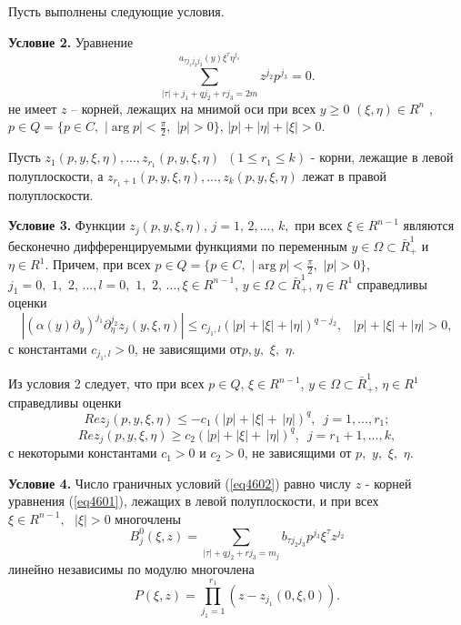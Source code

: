 Пусть выполнены следующие условия.

\textbf{Условие 2.} Уравнение
\[
\sum\limits_{\left| \tau \right| + j_1 + qj_2 + rj_3 = 2m}^ {a_{\tau j_1 j_2
j_3 } (y)\xi ^\tau \eta ^{j_1 }} z^{j_2 }p^{j_3 } = 0.
\]
не имеет $z$ -- корней, лежащих на мнимой оси при всех $y \ge 0\,\,(\xi
,\eta ) \in R^n\,\,$,$p \in Q = \{p \in C,\,\,\left| {\arg p} \right| <
\frac{\pi }{2},\,\,\left| p \right| > 0\}$, $\left| p \right| + \left| \eta
\right| + \left| \xi \right| > 0$.

Пусть $z_1 (p,y,\xi ,\eta ),...,z_{r_1 } (p,y,\xi ,\eta )\,\,\,(1 \le r_1
\le k)$ - корни, лежащие в левой полуплоскости, а $z_{r_1 + 1} (p,y,\xi
,\eta ),...,z_k (p,y,\xi ,\eta )$ лежат в правой полуплоскости.

\textbf{Условие 3.} Функции $z_j (p,y,\xi ,\eta )$, $j = 1,\,2,...,\,k,$ при
всех $\xi \in R^{n - 1}$ являются бесконечно дифференцируемыми функциями по
переменным $y \in \Omega \subset \bar {R}_ + ^1 $ и $\eta \in R^1$. Причем,
при всех $p \in Q = \{p \in C,\,\,\left| {\arg p} \right| < \frac{\pi
}{2},\,\,\left| p \right| > 0\}$, $j_1 = 0,\,\,1,\,\,2,\,...,l =
0,\,\,1,\,\,2,\,...,\xi \in R^{n - 1}$, $y \in \Omega \subset \bar {R}_ +
^1 $, $\eta \in R^1$ справедливы оценки
\[
\left| {(\alpha (y)\partial _y )^{j_1 }\partial _\eta ^{j_2 } z_j (y,\xi
,\eta )} \right| \le c_{j_1 ,l} (\left| p \right| + \left| \xi \right| +
\left| \eta \right|)^{q - j_2 },\,\,\,\,\,\left| p \right| + \left| \xi
\right| + \left| \eta \right| > 0,
\]
с константами $c_{j_1 ,l} > 0$, не зависящими от$p,y,\,\,\xi ,\,\,\eta .$

Из условия 2 следует, что при всех $p \in Q$, $\xi \in R^{n - 1}$, $y \in
\Omega \subset \bar {R}_ + ^1 $, $\eta \in R^1$ справедливы оценки
\[
Rez_j (p,y,\xi ,\eta ) \le - c_1 (\left| p \right| + \left| \xi \right| +
\,\left| \eta \right|)^q,\,\,\,j = 1,...,r_1 ;
\]
\[
Rez_j (p,y,\xi ,\eta ) \ge c_2 (\left| p \right| + \left| \xi \right| +
\,\left| \eta \right|)^q,\,\,\,j = r_1 + 1,...,k,
\]
с некоторыми константами $c_1 >0$
и $c_2 > 0$, не зависящими
от $p,\,\,y,\,\,\xi ,\,\,\eta $.

\textbf{Условие 4.} Число граничных условий (\ref{eq4602}) равно числу $z$ - корней
уравнения (\ref{eq4601}), лежащих в левой полуплоскости, и при всех $\xi \in R^{n -
1},\,\,\,\,\left| \xi \right| > 0$ многочлены
$$
	B_j^0 (\xi ,z) =
	\sum\limits_{\left| \tau \right| + qj_2 + rj_3 = m_j } {b_{\tau j_2 j_3 }
	p^{j_3 }} \xi ^\tau z^{j_2 }
$$
линейно независимы по модулю многочлена
$$
P(\xi ,z) = \prod\limits_{j_1 = 1}^{r_1 } {(z - z_{j_1 } (0,\xi ,0))} .
$$

